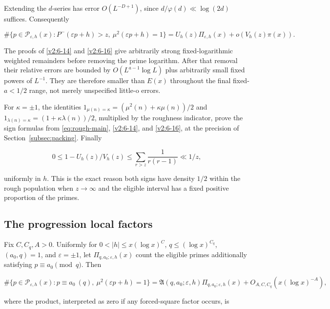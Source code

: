 \documentclass[11pt]{article}
\theoremstyle{definition}
\theoremstyle{remark}
\numberwithin{equation}{section}
\begin{document}
Extending the $d$-series has error $O(L^{-D+1})$, since $d/\varphi(d)\ll\log(2d)$ suffices. Consequently


\begin{equation}\label{v2:6-16}
\#\{p\in\mathcal P_{\varepsilon,h}(x):P^-(\varepsilon p+h)>z,\ \mu^2(\varepsilon p+h)=1\}
=U_h(z)\Pi_{\varepsilon,h}(x)+o(V_h(z)\pi(x)).
\end{equation}


The proofs of \eqref{v2:6-14} and \eqref{v2:6-16} give arbitrarily strong fixed-logarithmic weighted remainders before removing the prime logarithm. After that removal their relative errors are bounded by $O(L^{a-1}\log L)$ plus arbitrarily small fixed powers of $L^{-1}$. They are therefore smaller than $E(x)$ throughout the final fixed-$a<1/2$ range, not merely unspecified little-o errors.

For $\kappa=\pm1$, the identities $1_{\mu(n)=\kappa}=(\mu^2(n)+\kappa\mu(n))/2$ and $1_{\lambda(n)=\kappa}=(1+\kappa\lambda(n))/2$, multiplied by the roughness indicator, prove the sign formulas from \eqref{eq:rough-main}, \eqref{v2:6-14}, and \eqref{v2:6-16}, at the precision of Section~\ref{subsec:packing}. Finally


\begin{equation}
0\le1-U_h(z)/V_h(z)\le\sum_{r>z}\frac1{r(r-1)}\ll1/z,
\end{equation}


uniformly in $h$. This is the exact reason both signs have density $1/2$ within the rough population when $z\to\infty$ and the eligible interval has a fixed positive proportion of the primes.

\subsection{The progression local factors}\label{subsec:progression-density}
Fix $C,C_q,A>0$. Uniformly for $0<|h|\le x(\log x)^C$, $q\le(\log x)^{C_q}$, $(a_0,q)=1$, and $\varepsilon=\pm1$, let $\Pi_{q,a_0;\varepsilon,h}(x)$ count the eligible primes additionally satisfying $p\equiv a_0\pmod q$. Then


\begin{equation}\label{v2:13-1}
\#\{p\in\mathcal P_{\varepsilon,h}(x):p\equiv a_0\ (q),\ \mu^2(\varepsilon p+h)=1\}
=\mathfrak A(q,a_0;\varepsilon,h)\Pi_{q,a_0;\varepsilon,h}(x)+O_{A,C,C_q}(x(\log x)^{-A}),
\end{equation}


where the product, interpreted as zero if any forced-square factor occurs, is
\end{document}

